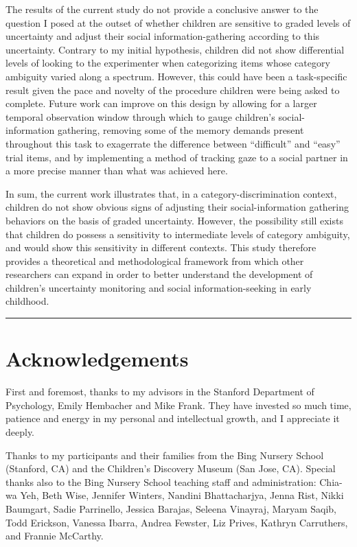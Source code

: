 \documentclass[floatsintext,man]{apa6}
\theoremstyle{definition}
\theoremstyle{definition}
\theoremstyle{definition}
\theoremstyle{remark}
\begin{document}
The results of the current study do not provide a conclusive answer to
the question I posed at the outset of whether children are sensitive to
graded levels of uncertainty and adjust their social
information-gathering according to this uncertainty. Contrary to my
initial hypothesis, children did not show differential levels of looking
to the experimenter when categorizing items whose category ambiguity
varied along a spectrum. However, this could have been a task-specific
result given the pace and novelty of the procedure children were being
asked to complete. Future work can improve on this design by allowing
for a larger temporal observation window through which to gauge
children's social-information gathering, removing some of the memory
demands present throughout this task to exagerrate the difference
between \enquote{difficult} and \enquote{easy} trial items, and by
implementing a method of tracking gaze to a social partner in a more
precise manner than what was achieved here.

In sum, the current work illustrates that, in a category-discrimination
context, children do not show obvious signs of adjusting their
social-information gathering behaviors on the basis of graded
uncertainty. However, the possibility still exists that children do
possess a sensitivity to intermediate levels of category ambiguity, and
would show this sensitivity in different contexts. This study therefore
provides a theoretical and methodological framework from which other
researchers can expand in order to better understand the development of
children's uncertainty monitoring and social information-seeking in
early childhood.

\begin{center}\rule{0.5\linewidth}{\linethickness}\end{center}

\section{Acknowledgements}\label{acknowledgements}

First and foremost, thanks to my advisors in the Stanford Department of
Psychology, Emily Hembacher and Mike Frank. They have invested so much
time, patience and energy in my personal and intellectual growth, and I
appreciate it deeply.

Thanks to my participants and their families from the Bing Nursery
School (Stanford, CA) and the Children's Discovery Museum (San Jose,
CA). Special thanks also to the Bing Nursery School teaching staff and
administration: Chia-wa Yeh, Beth Wise, Jennifer Winters, Nandini
Bhattacharjya, Jenna Rist, Nikki Baumgart, Sadie Parrinello, Jessica
Barajas, Seleena Vinayraj, Maryam Saqib, Todd Erickson, Vanessa Ibarra,
Andrea Fewster, Liz Prives, Kathryn Carruthers, and Frannie McCarthy.
\end{document}
